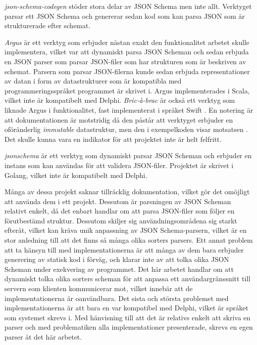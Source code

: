 \textit{json-schema-codegen} stöder stora delar av JSON Schema men inte allt. Verktyget parsar ett JSON Schema och genererar sedan kod som kan parsa JSON som är strukturerade efter schemat. \cite{Tundra}

\textit{Argus} är ett verktyg som erbjuder nästan exakt den funktionalitet arbetet skulle implementera, vilket var att dynamiskt parsa JSON Scheman och sedan erbjuda en JSON parser som parsar JSON-filer som har strukturen som är beskriven av schemat. Parsern som parsar JSON-filerna kunde sedan erbjuda representationer av datan i form av datastrukturer som är kompatibla med programmeringsspråket programmet är skrivet i. Argus implementerades i Scala, vilket inte är kompatibelt med Delphi. \cite{Fenton} \textit{Bric-à-brac} är också ett verktyg som liknade Argus i funktionalitet, fast implementerat i språket Swift \cite{GlimpseI/OInc}. En notering är att dokumentationen är motstridig då den påstår att verktyget erbjuder en oföränderlig \textit{immutable} datastruktur, men den i exempelkoden visar motsatsen \cite{GlimpseI/OInc}. Det skulle kunna vara en indikator för att projektet inte är helt felfritt.

\textit{jsonschema} är ett verktyg som dynamiskt parsar JSON Scheman och erbjuder en instans som kan användas för att validera JSON-filer. Projektet är skrivet i Golang, vilket inte är kompatibelt med Delphi. \cite{Qriinc.}

Många av dessa projekt saknar tillräcklig dokumentation, vilket gör det omöjligt att använda dem i ett projekt. Dessutom är parsningen av JSON Scheman relativt enkelt, då det enbart handlar om att parsa JSON-filer som följer en förutbestämd struktur. Dessutom skiljer sig användningsområdena sig starkt efteråt, vilket kan kräva unik anpassning av JSON Schema-parsern, vilket är en stor anledning till att det finns så många olika sorters parsers. Ett annat problem att ta hänsyn till med implementationerna är att många av dem bara erbjuder generering av statisk kod i förväg, och klarar inte av att tolka olika JSON Scheman under exekvering av programmet. Det här arbetet handlar om att dynamiskt tolka olika sorters scheman för att anpassa ett användargränssnitt till servern som klienten kommunicerar mot, vilket innebär att de implementationerna är oanvändbara. Det sista och största problemet med implementationerna är att bara en var kompatibel med Delphi, vilket är språket som systemet skrevs i. Med hänvisning till att det är relativs enkelt att skriva en parser och med problematiken alla implementationer presenterade, skrevs en egen parser åt det här arbetet.

